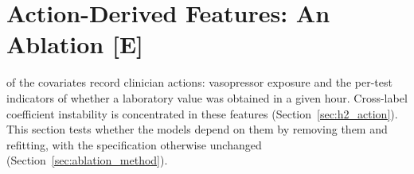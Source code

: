 

\section{Action-Derived Features: An Ablation \texorpdfstring{[E]}{[E]}}
\label{sec:ablation}

\pcAblNDropped{} of the \pcHTwoNTerms{} covariates record clinician actions:
vasopressor exposure and the per-test indicators of whether a laboratory value
was obtained in a given hour. Cross-label coefficient instability is
concentrated in these features (Section~\ref{sec:h2_action}). This section
tests whether the models depend on them by removing them and refitting, with
the specification otherwise unchanged (Section~\ref{sec:ablation_method}).

\begin{table}[H]
    \centering\small
    \caption{Discrimination and best-threshold Utility Score with and without
    the \pcAblNDropped{} action-derived features. $\Delta$ is a paired
    difference; Table~\ref{tab:ablation_ci} carries its interval.
    \textbf{[E] exploratory.}}
    \label{tab:ablation}
\end{table}

